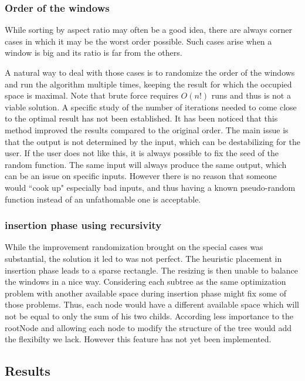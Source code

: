 \documentclass{acmtog}
\begin{document}
\subsubsection{Order of the windows} While sorting by aspect ratio may often be a good idea, there are always corner cases in which it may be the worst order possible. Such cases arise when a window is big and its ratio is far from the others.

A natural way to deal with those cases is to randomize the order of the windows and run the algorithm multiple times, keeping the result for which the occupied space is maximal. Note that brute force requires $O(n!)$ runs and thus is not a viable solution. A specific study of the number of iterations needed to come close to the optimal result has not been established. It has been noticed that this method improved the results compared to the original order. The main issue is that the output is not determined by the input, which can be destabilizing for the user. If the user does not like this, it is always possible to fix the seed of the random function. The same input will always produce the same output, which can be an issue on specific inputs. However there is no reason that someone would ``cook up" especially bad inputs, and thus having a known pseudo-random function instead of an unfathomable one is acceptable.  

\subsubsection{insertion phase using recursivity}
While the improvement randomization brought on the special cases was substantial, the solution it led to was not perfect. The heuristic placement in insertion phase leads to a sparse rectangle. The resizing is then unable to balance the windows in a nice way. Considering each subtree as the same optimization problem with another available space during insertion phase might fix some of those problems. Thus, each node would have a different available space which will not be equal to only the sum of his two childs. According less importance to the rootNode and allowing each node to modify the structure of the tree would add the flexibilty we lack. However this feature has not yet been implemented.

\subsection{Results}
\end{document}

